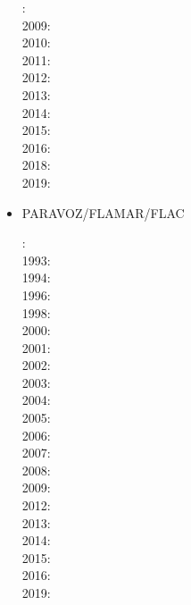 \begin{itemize}
{\small
{}: \cite{daks08}\cite{scdk08}\\
2009: \cite{gogk09}\\
2010: \cite{krda10}\cite{kaus10}\\
2011: \cite{yakm11}\\
2012: \cite{gebk12}\cite{rukb12}\cite{thka12}\\
2013: \cite{scpo13}\\
2014: \cite{jobk14}\\
2015: \cite{lukz15}\cite{gehm15}\cite{thkp15}\cite{musd15}\\
2016: \cite{jads16}\cite{maka16}\cite{cakp16}\\
2018: \cite{dusd18}\cite{jasc18}\cite{jadg18}\cite{comj18}\cite{jens18}\cite{rabw18}\cite{chsm18}\\
2019: \cite{anpa19}\cite{sifg19}\cite{baba19}\cite{sogh19}
}


\item PARAVOZ/FLAMAR/FLAC 

{\small
{}: \cite{cund89}\cite{hoor89}\\
1993: \cite{pocp93}\cite{zhhj93}\\
1994: \cite{wizh94}\\
1996: \cite{hach96}\cite{zhho96}\\
1998: \cite{gepd98}\\
2000: \cite{labp00}\\
2001: \cite{bujl01}\cite{bupo01}\\
2002: \cite{bast02}\cite{clbb02}\\
2003: \cite{hags03}\cite{gehd03}\cite{upke03}\\
2004: \cite{guhl04}\cite{gewi04}\cite{toba04}\cite{tibb04}\cite{clbm04}\cite{tobj04}\\
2005: \cite{bugu05}\\
2006: \cite{buwa06}\cite{lemm06}\\
2007: \cite{yaab07}\cite{buto07}\cite{chem07}\\
2008: \cite{yaba08}\cite{tibb08}\cite{buya08}\\
2009: \cite{gecm09}\cite{yahb09}\cite{bucl09}\cite{tigv09}\cite{yamb09}\\
2012: \cite{anwb12}\cite{gech12}\cite{gubc12}\cite{gerb12}\\
2013: \cite{wabd13}\cite{frbm13}\cite{tibb13}\\
2014: \cite{frba14}\cite{gagb14}\cite{bufa14}\cite{bufy14b}\\
2015: \cite{wulc15}\cite{gebw15}\cite{svlh15}\\
2016: \cite{marl16}\\
2019: \cite{jala19}
}


\end{itemize}
